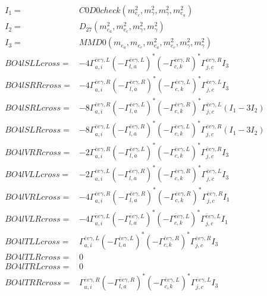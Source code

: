 \documentclass[A4,landscape]{article}
\begin{document}
\begin{align} 
I_1 = & C0D0check(m^2_{e_{{c}}}, m^2_{\gamma}, m^2_{\gamma}, m^2_{e_{{a}}}) \\ 
I_2 = & D_{27}(m^2_{e_{{a}}}, m^2_{e_{{c}}}, m^2_{\gamma}, m^2_{\gamma}) \\ 
I_3 = & MMD0(m_{e_{{a}}}, m_{e_{{c}}}, m^2_{e_{{a}}}, m^2_{e_{{c}}}, m^2_{\gamma}, m^2_{\gamma}) \\ 
  BO4lSLLcross= & -4  \Gamma^{\bar{e}e \gamma ,L}_{a, i} (- \Gamma^{\bar{e}e \gamma ,L} _{l, a})^* (- \Gamma^{\bar{e}e \gamma ,R} _{c, k})^* \Gamma^{\bar{e}e \gamma ,R}_{j, c} I_3 \\ 
  BO4lSRRcross= & -4  \Gamma^{\bar{e}e \gamma ,R}_{a, i} (- \Gamma^{\bar{e}e \gamma ,R} _{l, a})^* (- \Gamma^{\bar{e}e \gamma ,L} _{c, k})^* \Gamma^{\bar{e}e \gamma ,L}_{j, c} I_3 \\ 
  BO4lSRLcross= & -8  \Gamma^{\bar{e}e \gamma ,R}_{a, i} (- \Gamma^{\bar{e}e \gamma ,L} _{l, a})^* (- \Gamma^{\bar{e}e \gamma ,R} _{c, k})^* \Gamma^{\bar{e}e \gamma ,L}_{j, c} (I_1 - 3 I_2) \\ 
  BO4lSLRcross= & -8  \Gamma^{\bar{e}e \gamma ,L}_{a, i} (- \Gamma^{\bar{e}e \gamma ,R} _{l, a})^* (- \Gamma^{\bar{e}e \gamma ,L} _{c, k})^* \Gamma^{\bar{e}e \gamma ,R}_{j, c} (I_1 - 3 I_2) \\ 
  BO4lVRRcross= & -2  \Gamma^{\bar{e}e \gamma ,R}_{a, i} (- \Gamma^{\bar{e}e \gamma ,L} _{l, a})^* (- \Gamma^{\bar{e}e \gamma ,L} _{c, k})^* \Gamma^{\bar{e}e \gamma ,R}_{j, c} I_3 \\ 
  BO4lVLLcross= & -2  \Gamma^{\bar{e}e \gamma ,L}_{a, i} (- \Gamma^{\bar{e}e \gamma ,R} _{l, a})^* (- \Gamma^{\bar{e}e \gamma ,R} _{c, k})^* \Gamma^{\bar{e}e \gamma ,L}_{j, c} I_3 \\ 
  BO4lVRLcross= & -4  \Gamma^{\bar{e}e \gamma ,R}_{a, i} (- \Gamma^{\bar{e}e \gamma ,R} _{l, a})^* (- \Gamma^{\bar{e}e \gamma ,R} _{c, k})^* \Gamma^{\bar{e}e \gamma ,R}_{j, c} I_1 \\ 
  BO4lVLRcross= & -4  \Gamma^{\bar{e}e \gamma ,L}_{a, i} (- \Gamma^{\bar{e}e \gamma ,L} _{l, a})^* (- \Gamma^{\bar{e}e \gamma ,L} _{c, k})^* \Gamma^{\bar{e}e \gamma ,L}_{j, c} I_1 \\ 
  BO4lTLLcross= &  \Gamma^{\bar{e}e \gamma ,L}_{a, i} (- \Gamma^{\bar{e}e \gamma ,L} _{l, a})^* (- \Gamma^{\bar{e}e \gamma ,R} _{c, k})^* \Gamma^{\bar{e}e \gamma ,R}_{j, c} I_3 \\ 
  BO4lTLRcross= & 0 \\ 
  BO4lTRLcross= & 0 \\ 
  BO4lTRRcross= &  \Gamma^{\bar{e}e \gamma ,R}_{a, i} (- \Gamma^{\bar{e}e \gamma ,R} _{l, a})^* (- \Gamma^{\bar{e}e \gamma ,L} _{c, k})^* \Gamma^{\bar{e}e \gamma ,L}_{j, c} I_3 \\ 
\end{align} 
\end{document}
